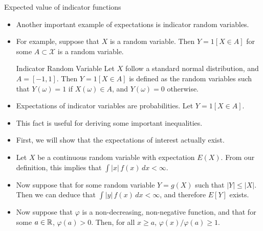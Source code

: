 \begin{frame}[allowframebreaks]{Expected value of indicator functions}
  \begin{itemize}
    \item Another important example of expectations is \alert{indicator} random variables.
    \item For example, suppose that $X$ is a random variable. Then $Y = 1[X \in A]$ for some $A \subset \mathcal{X}$ is a random variable.
    
    \begin{exampleblock}{Indicator Random Variable}
      Let $X$ follow a standard normal distribution, and $A = [-1, 1]$. Then $Y = 1[X \in A]$ is defined as the random variables such that $Y(\omega) = 1$ if $X(\omega) \in A$, and $Y(\omega) = 0$ otherwise.
    \end{exampleblock}
    
    \framebreak
    
    \item Expectations of indicator variables are \alert{probabilities}. Let $Y = 1[X \in A]$. 
    
    \item This fact is useful for deriving some important inequalities.
    \item First, we will show that the expectations of interest actually exist.
    
    \framebreak
    
    \item Let $X$ be a continuous random variable with expectation $E(X)$. From our definition, this implies that $\int |x|\, f(x)\,dx < \infty$.
    \item Now suppose that for some random variable $Y = g(X)$ such that $|Y| \leq |X|$. Then we can deduce that $\int |y|\, f(x)\,dx < \infty$, and therefore $E[Y]$ exists.
    \item Now suppose that $\varphi$ is a non-decreasing, non-negative function, and that for some $a \in \mathbb{R}$, $\varphi(a) > 0$. Then, for all $x \geq a$, $\varphi(x) / \varphi(a) \geq 1$.
    

\end{itemize}
\end{frame}
